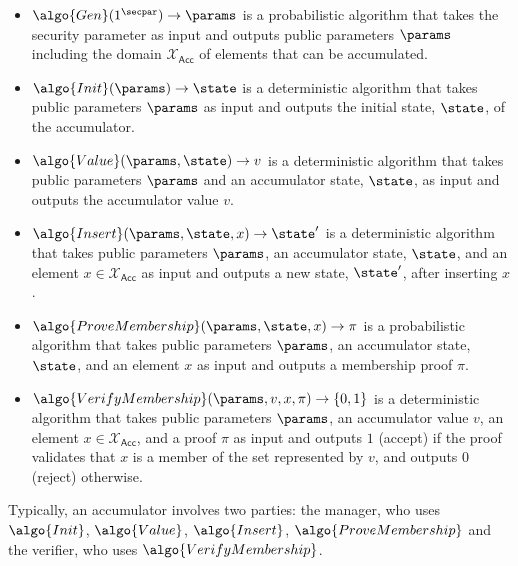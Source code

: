 \begin{definition}[Accumulator]
\begin{itemize}
    \item $\algo{Gen}(1^\secpar) \rightarrow \params$ is a probabilistic algorithm that takes the security parameter as input and outputs public parameters $\params$ including the domain $\mathcal{X}_\mathsf{Acc}$ of elements that can be accumulated.
    \item $\algo{Init}(\params) \rightarrow \state$ is a deterministic algorithm that takes public parameters $\params$ as input and outputs the initial state, $\state$, of the accumulator.
    \item $\algo{Value}(\params, \state) \rightarrow v$ is a deterministic algorithm that takes public parameters $\params$ and an accumulator state, $\state$, as input and outputs the accumulator value $v$.
    \item $\algo{Insert}(\params, \state, x) \rightarrow \state'$ is a deterministic algorithm that takes public parameters $\params$, an accumulator state, $\state$, and an element $x \in \mathcal{X}_\mathsf{Acc}$ as input and outputs a new state, $\state'$, after inserting $x$.
    \item $\algo{ProveMembership}(\params, \state, x) \rightarrow \pi$ is a probabilistic algorithm that takes public parameters $\params$, an accumulator state, $\state$, and an element $x$ as input and outputs a membership proof $\pi$.
    \item $\algo{VerifyMembership}(\params, v, x, \pi) \rightarrow \{0, 1\}$ is a deterministic algorithm that takes public parameters $\params$, an accumulator value $v$, an element $x \in \mathcal{X}_\mathsf{Acc}$, and a proof $\pi$ as input and outputs $1$ (accept) if the proof validates that $x$ is a member of the set represented by $v$, and outputs $0$ (reject) otherwise.
\end{itemize}
\end{definition}

Typically, an accumulator involves two parties: the manager, who uses $\algo{Init}$, $\algo{Value}$, $\algo{Insert}$, $\algo{ProveMembership}$ and the verifier, who uses $\algo{VerifyMembership}$.

